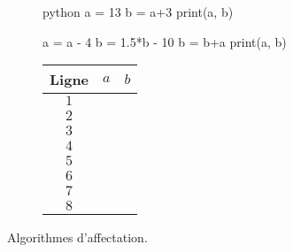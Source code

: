 \begin{figure}[h]
\begin{subfigure}{.5\textwidth}
\vspace{15pt}
\begin{mintedbox}{python}
a = 13
b = a+3
print(a, b)

a = a - 4
b = 1.5*b - 10
b = b+a
print(a, b)
\end{mintedbox}
\end{subfigure}
\hfill
\begin{subfigure}{.45\textwidth}
	\begin{tabular}{|c|c|c|}\hline
		Ligne & $a$ & $b$ \\ \hline
		$1$ && \\ \hline
		$2$ && \\ \hline
		$3$ && \\ \hline
		$4$ && \\ \hline
		$5$ && \\ \hline
		$6$ && \\ \hline
		$7$ && \\ \hline
		$8$ && \\ \hline
	\end{tabular}
\end{subfigure}

\caption{Algorithmes d'affectation.}
\label{fig:1}
\end{figure}


\newpage


